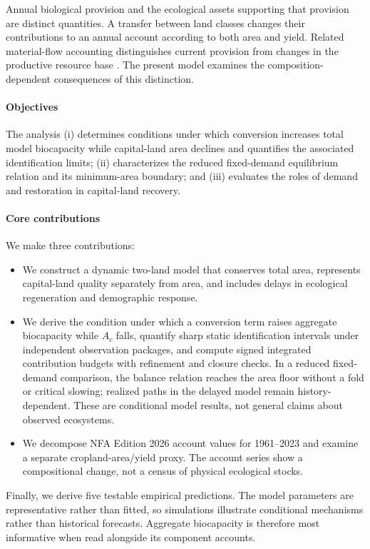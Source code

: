 \documentclass[preprint,12pt,authoryear]{elsarticle}
\begin{document}
Annual biological provision and the ecological assets supporting that provision are distinct quantities. A transfer between land classes changes their contributions to an annual account according to both area and yield. Related material-flow accounting distinguishes current provision from changes in the productive resource base \citep{Abaee2026c}. The present model examines the composition-dependent consequences of this distinction.

\paragraph{Objectives} The analysis (i) determines conditions under which conversion increases total model biocapacity while capital-land area declines and quantifies the associated identification limits; (ii) characterizes the reduced fixed-demand equilibrium relation and its minimum-area boundary; and (iii) evaluates the roles of demand and restoration in capital-land recovery.

\paragraph{Core contributions} We make three contributions:
\begin{itemize}
  \item We construct a dynamic two-land model that conserves total area, represents capital-land quality separately from area, and includes delays in ecological regeneration and demographic response.
  \item We derive the condition under which a conversion term raises aggregate biocapacity while $A_c$ falls, quantify sharp static identification intervals under independent observation packages, and compute signed integrated contribution budgets with refinement and closure checks. In a reduced fixed-demand comparison, the balance relation reaches the area floor without a fold or critical slowing; realized paths in the delayed model remain history-dependent. These are conditional model results, not general claims about observed ecosystems.
  \item We decompose NFA Edition 2026 account values for 1961--2023 and examine a separate cropland-area/yield proxy. The account series show a compositional change, not a census of physical ecological stocks.
\end{itemize}

Finally, we derive five testable empirical predictions. The model parameters are representative rather than fitted, so simulations illustrate conditional mechanisms rather than historical forecasts. Aggregate biocapacity is therefore most informative when read alongside its component accounts.
\end{document}
